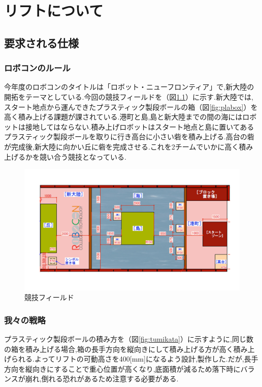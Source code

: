 \chapter{リフトについて}

\section{要求される仕様}
\subsection{ロボコンのルール}
今年度のロボコンのタイトルは「ロボット・ニューフロンティア」で,新大陸の開拓をテーマとしている.今回の競技フィールドを（図\ref{fig:field}）に示す.新大陸では,スタート地点から運んできたプラスティック製段ボールの箱（図\ref{fig:plabox}）を高く積み上げる課題が課されている.港町と島,島と新大陸までの間の海にはロボットは接地してはならない.積み上げロボットはスタート地点と島に置いてあるプラスティック製段ボールを取りに行き高台に小さい砦を積み上げる.高台の砦が完成後,新大陸に向かい丘に砦を完成させる.これを2チームでいかに高く積み上げるかを競い合う競技となっている.

\begin{figure}[htbp]
  \begin{center}
    \includegraphics[width=130mm]{img/field.png}
    \end{center}
  \caption{競技フィールド}
 \label{fig:field}
\end{figure}

\subsection{我々の戦略}
プラスティック製段ボールの積み方を（図\ref{fig:tumikata}）に示すように,同じ数の箱を積み上げる場合,箱の長手方向を縦向きにして積み上げる方が高く積み上げられる.よってリフトの可動高さを400[mm]になるよう設計,製作した.だが,長手方向を縦向きにすることで重心位置が高くなり,底面積が減るため落下時にバランスが崩れ,倒れる恐れがあるため注意する必要がある.



